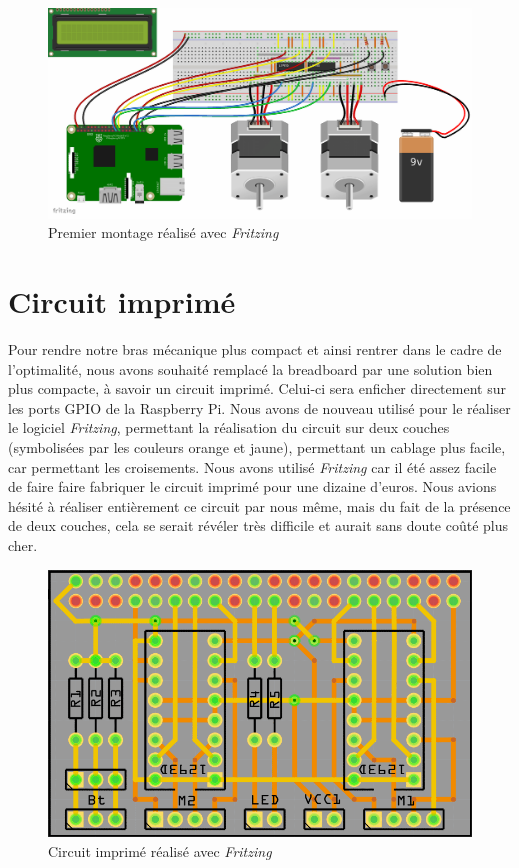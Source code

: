 \documentclass[12pt,a4paper]{report}
\begin{document}
\begin{figure}[!h]
 \center
 \includegraphics[scale=0.45]{../pictures/Sudoku_schema}
 \caption{Premier montage réalisé avec \emph{Fritzing}}
\end{figure}

\section{Circuit imprimé}
Pour rendre notre bras mécanique plus compact et ainsi rentrer dans le cadre de l'optimalité, nous avons souhaité remplacé la breadboard par une solution bien plus compacte, à savoir un circuit imprimé. Celui-ci sera enficher directement sur les ports GPIO de la Raspberry Pi. Nous avons de nouveau utilisé pour le réaliser le logiciel \emph{Fritzing}, permettant la réalisation du circuit sur deux couches (symbolisées par les couleurs orange et jaune), permettant un cablage plus facile, car permettant les croisements. Nous avons utilisé \emph{Fritzing} car il été assez facile de faire faire fabriquer le circuit imprimé pour une dizaine d'euros. Nous avions hésité à réaliser entièrement ce circuit par nous même, mais du fait de la présence de deux couches, cela se serait révéler très difficile et aurait sans doute coûté plus cher.

\begin{figure}[!h]
 \center
 \includegraphics[scale=0.5]{../pictures/Sudoku_circuit_imprime.png}
 \caption{Circuit imprimé réalisé avec \emph{Fritzing}}
\end{figure}
\end{document}
